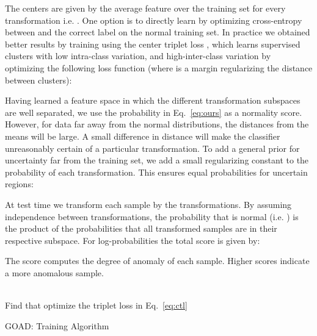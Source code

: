 \documentclass{article} \usepackage{iclr2020_conference,times}
\begin{document}
The centers  are given by the average feature over the training set for every transformation i.e. . One option is to directly learn  by optimizing cross-entropy between  and the correct label on the normal training set. In practice we obtained better results by training  using the center triplet loss \citep{he2018triplet}, which learns supervised clusters with low intra-class variation, and high-inter-class variation by optimizing the following loss function (where  is a margin regularizing the distance between clusters):



Having learned a feature space in which the different transformation subspaces are well separated, we use the probability in Eq.~\ref{eq:ours} as a normality score. However, for data far away from the normal distributions, the distances from the means will be large. A small difference in distance will make the classifier unreasonably certain of a particular transformation. To add a general prior for uncertainty far from the training set, we add a small regularizing constant  to the probability of each transformation. This ensures equal probabilities for uncertain regions:



At test time we transform each sample by the  transformations. By assuming independence between transformations, the probability that  is normal (i.e. ) is the product of the probabilities that all transformed samples are in their respective subspace. For log-probabilities the total score is given by:



The score computes the degree of anomaly of each sample. Higher scores indicate a more anomalous sample.


\begin{algorithm}[H]
\SetAlgoLined
{}
\hspace*{\algorithmicindent}
\hspace*{\algorithmicindent}
\hspace*{\algorithmicindent}  \\ 
\hspace*{\algorithmicindent} Find  that optimize the triplet loss in Eq.~\ref{eq:ctl}

\caption{GOAD: Training Algorithm}
\end{algorithm}
\end{document}

